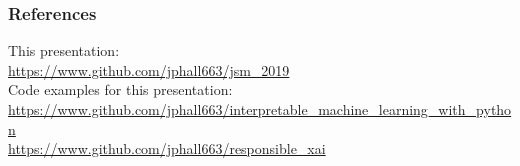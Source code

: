 \documentclass[11pt,
               aspectratio=43,
               hyperref={colorlinks}
               ]{beamer}
\begin{document}


	\begin{frame}[t, allowframebreaks]
	
		\frametitle{References}	
		
			This presentation:\\
			\tiny{\url{https://www.github.com/jphall663/jsm_2019}}\\
			\vspace{10pt}
			\normalsize Code examples for this presentation:\\
			\tiny{\url{https://www.github.com/jphall663/interpretable_machine_learning_with_python}}\\
			\noindent\tiny{\url{https://www.github.com/jphall663/responsible_xai}}
								
		\framebreak		
		
		\printbibliography
		
	\end{frame}
\end{document}
